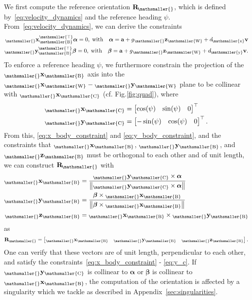 \documentclass[10pt,a4paper,fleqn]{article}
\newcommand{\vel}[0]{\bVec{v}} %
\newcommand{\acc}[0]{\bVec{a}} %
\newcommand{\bVec}[1]{\mathbf{#1}}
\newcommand{\sVec}[1]{\begin{bmatrix} #1 \end{bmatrix}}
\newcommand{\norm}[1]{\left\lVert#1\right\rVert}
\newcommand{\vect}[3]{{_{\mathsmaller{\mathrm{#2}}}\mathbf{#1}_{\mathsmaller{\mathrm{#3}}}}} %
\newcommand{\vecttrans}[3]{{_{\mathsmaller{\mathrm{#2}}}\mathbf{#1}_{\mathsmaller{\mathrm{#3}}}^{\mathsmaller{\top}}}} %
\newcommand{\wfr}[0]{\ensuremath{W}} %
\newcommand{\bfr}[0]{\ensuremath{B}} %
\newcommand{\cfr}[0]{\ensuremath{C}} %
\newcommand{\gravacc}[0]{\ensuremath{g}} %
\newcommand{\ori}[1]{\bVec{R}_{\!\mathsmaller{\mathrm{#1}}}} %
\newcommand{\heading}[0]{\psi} %
\newcommand{\dragcoeff}[1]{\ensuremath{d}_{\!\mathsmaller{\mathrm{#1}}}} %
\begin{document}
We first compute the reference orientation $\ori{}$, which is defined by~\eqref{eq:velocity_dynamics} and the reference heading $\heading$.
From~\eqref{eq:velocity_dynamics}, we can derive the constraints
%
\begin{align}
	\vecttrans{x}{}{\bfr} \boldsymbol{\alpha} = 0, \; \text{with} \quad \boldsymbol{\alpha} = \acc + \gravacc \vect{z}{}{\wfr} + \dragcoeff{x} \vel \label{eq:x_body_constraint}\\
	\vecttrans{y}{}{\bfr} \boldsymbol{\beta} = 0, \; \text{with} \quad \boldsymbol{\beta} = \acc + \gravacc \vect{z}{}{\wfr} + \dragcoeff{y} \vel . \label{eq:y_body_constraint}
\end{align}
%
To enforce a reference heading $\heading$, we furthermore constrain the projection of the $\vect{x}{}{\bfr}$ axis into the $\vect{x}{}{\wfr} - \vect{y}{}{\wfr}$ plane to be collinear with $\vect{x}{}{\cfr}$ (cf. Fig.\ref{fig:quad}), where
%
\begin{align}
	\vect{x}{}{\cfr} &= \begin{bmatrix}
		\cos(\heading) & \sin(\heading) & 0
	\end{bmatrix}^{\top} \\
	\vect{y}{}{\cfr} &= \begin{bmatrix}
		-\sin(\heading) & \cos(\heading) & 0
	\end{bmatrix}^{\top} . \label{eq:y_c}
\end{align}
%
From this, \eqref{eq:x_body_constraint} and \eqref{eq:y_body_constraint}, and the constraints that $\vect{x}{}{\bfr}$, $\vect{y}{}{\bfr}$, and $\vect{z}{}{\bfr}$ must be orthogonal to each other and of unit length, we can construct $\ori{}$ with
%
\begin{align}
	\vect{x}{}{\bfr} &= \frac{\vect{y}{}{\cfr} \times \boldsymbol{\alpha}}{\norm{\vect{y}{}{\cfr} \times \boldsymbol{\alpha}}} \label{eq:x_body_computation} \\
	\vect{y}{}{\bfr} &= \frac{\boldsymbol{\beta} \times \vect{x}{}{\bfr}}{\norm{\boldsymbol{\beta} \times \vect{x}{}{\bfr}}} \\
	\vect{z}{}{\bfr} &= \vect{x}{}{\bfr} \times \vect{y}{}{\bfr}
\end{align}
%
as
\begin{equation}
	\ori{} = \sVec{\vect{x}{}{\bfr} & \vect{y}{}{\bfr} & \vect{z}{}{\bfr}} .
\end{equation}
%
One can verify that these vectors are of unit length, perpendicular to each other, and satisfy the constraints~\eqref{eq:x_body_constraint} - \eqref{eq:y_c}.
If $\vect{y}{}{\cfr}$ is collinear to $\boldsymbol{\alpha}$ or $\boldsymbol{\beta}$ is collinear to $\vect{x}{}{\bfr}$, the computation of the orientation is affected by a singularity which we tackle as described in Appendix~\ref{sec:singularities}.
\end{document}
